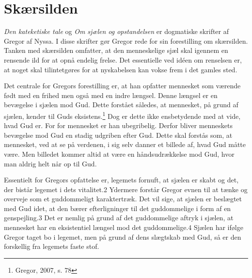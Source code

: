 \chapter{Skærsilden}
\textit{Den kateketiske tale} og \textit{Om sjælen og opstandelsen} er dogmatiske skrifter af Gregor af Nyssa. I disse skrifter gør Gregor rede for sin forestilling om skærsilden. Tanken med skærsilden omfatter, at den menneskelige sjæl skal igennem en rensende ild for at opnå endelig frelse. Det essentielle ved idéen om renselsen er, at noget skal tilintetgøres for at nyskabelsen kan vokse frem i det gamles sted.

Det centrale for Gregors forestilling er, at han opfatter mennesket som værende født med en frihed men også med en indre længsel. Denne længsel er en bevægelse i sjælen mod Gud. Dette forstået således, at mennesket, på grund af sjælen, kender til Guds eksistens.\footnote{Gregor, 2007, s. 78} Dog er dette ikke ensbetydende med at vide, hvad Gud er. For for mennesket er han ubegribelig. Derfor bliver menneskets bevægelse mod Gud en stadig udgriben efter Gud. Dette skal forstås som, at mennesket, ved at se på verdenen, i sig selv danner et billede af, hvad Gud måtte være. Men billedet kommer altid at være en håndsudrækkelse mod Gud, hvor man aldrig helt når op til Gud.

Essentielt for Gregors opfattelse er, legemets fornuft, at sjælen er skabt og det, der bistår legemet i dets vitalitet.2 Ydermere forstår Gregor evnen til at tænke og overveje som et guddommeligt karaktertræk. Det vil sige, at sjælen er beslægtet med Gud idet, at den bærer efterligninger til det guddommelige i form af en genspejling.3 Det er nemlig på grund af det guddommelige aftryk i sjælen, at mennesket har en eksistentiel længsel mod det guddommelige.4 Sjælen har ifølge Gregor taget bo i legemet, men på grund af dens slægtskab med Gud, så er den forskellig fra legemets faste stof.

